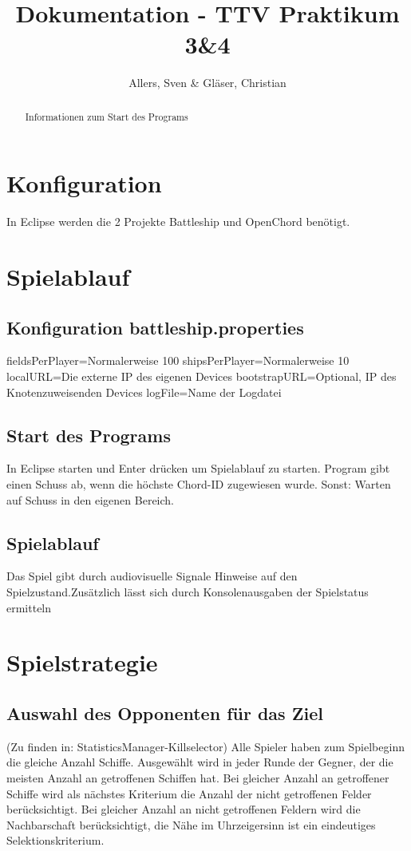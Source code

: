 \documentclass[a4paper]{article}
\title{Dokumentation - TTV Praktikum 3\&4}
\author{Allers, Sven \& Gläser, Christian}
\begin{document}
\maketitle

\begin{abstract}
Informationen zum Start des Programs
\end{abstract}
\section{Konfiguration}
In Eclipse werden die 2 Projekte Battleship und OpenChord benötigt.
\section{Spielablauf}
\subsection{Konfiguration battleship.properties}
fieldsPerPlayer=Normalerweise 100\newline
shipsPerPlayer=Normalerweise 10\newline
localURL=Die externe IP des eigenen Devices\newline
bootstrapURL=Optional, IP des Knotenzuweisenden Devices\newline
logFile=Name der Logdatei \newline
\subsection{Start des Programs}
In Eclipse starten und Enter drücken um Spielablauf zu starten. Program gibt einen Schuss ab, wenn die höchste Chord-ID zugewiesen wurde.\newline
Sonst: Warten auf Schuss in den eigenen Bereich.
\subsection{Spielablauf}
Das Spiel gibt durch audiovisuelle Signale Hinweise auf den Spielzustand.\newline Zusätzlich lässt sich durch Konsolenausgaben der Spielstatus ermitteln
\section{Spielstrategie}
\subsection{Auswahl des Opponenten für das Ziel}
(Zu finden in: StatisticsManager-Killselector)\newline
Alle Spieler haben zum Spielbeginn die gleiche Anzahl Schiffe. \newline
Ausgewählt wird in jeder Runde der Gegner, der die meisten Anzahl an getroffenen Schiffen hat.\newline
Bei gleicher Anzahl an getroffener Schiffe wird als nächstes Kriterium die Anzahl der nicht getroffenen Felder berücksichtigt.\newline
Bei gleicher Anzahl an nicht getroffenen Feldern wird die Nachbarschaft berücksichtigt, die Nähe im Uhrzeigersinn ist ein eindeutiges Selektionskriterium.
\end{document}
